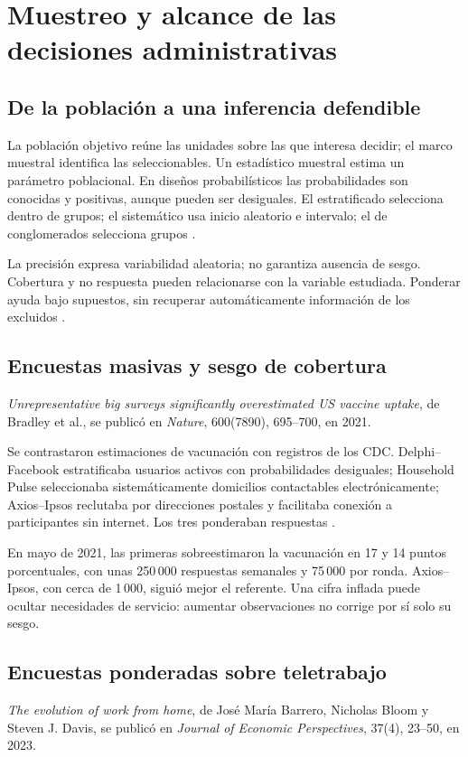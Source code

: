 {\section{Muestreo y alcance de las decisiones administrativas}
\subsection{De la población a una inferencia defendible}
La población objetivo reúne las unidades sobre las que interesa decidir; el marco muestral identifica las seleccionables. Un estadístico muestral estima un parámetro poblacional. En diseños probabilísticos las probabilidades son conocidas y positivas, aunque pueden ser desiguales. El estratificado selecciona dentro de grupos; el sistemático usa inicio aleatorio e intervalo; el de conglomerados selecciona grupos \citep{holmesBusiness2023}.

La precisión expresa variabilidad aleatoria; no garantiza ausencia de sesgo. Cobertura y no respuesta pueden relacionarse con la variable estudiada. Ponderar ayuda bajo supuestos, sin recuperar automáticamente información de los excluidos \citep{holmesBusiness2023,bradley2021}.

\subsection{Encuestas masivas y sesgo de cobertura}
\textit{Unrepresentative big surveys significantly overestimated US vaccine uptake}, de Bradley et al., se publicó en \textit{Nature}, 600(7890), 695--700, en 2021.

Se contrastaron estimaciones de vacunación con registros de los CDC. Delphi--Facebook estratificaba usuarios activos con probabilidades desiguales; Household Pulse seleccionaba sistemáticamente domicilios contactables electrónicamente; Axios--Ipsos reclutaba por direcciones postales y facilitaba conexión a participantes sin internet. Los tres ponderaban respuestas \citep{bradley2021}.

En mayo de 2021, las primeras sobreestimaron la vacunación en 17 y 14 puntos porcentuales, con unas 250\,000 respuestas semanales y 75\,000 por ronda. Axios--Ipsos, con cerca de 1\,000, siguió mejor el referente. Una cifra inflada puede ocultar necesidades de servicio: aumentar observaciones no corrige por sí solo su sesgo.

\subsection{Encuestas ponderadas sobre teletrabajo}
\textit{The evolution of work from home}, de José María Barrero, Nicholas Bloom y Steven J. Davis, se publicó en \textit{Journal of Economic Perspectives}, 37(4), 23--50, en 2023.

}

